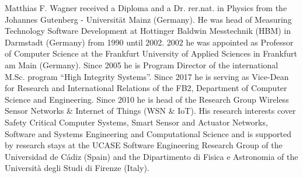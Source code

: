 \documentclass[10pt,journal,compsoc]{IEEEtran}
\begin{document}
\begin{IEEEbiography}{Matthias F. Wagner}
	 received a Diploma and a Dr. rer.nat. in Physics from the Johannes Gutenberg - Universität Mainz (Germany). He was head of Measuring Technology Software Development at Hottinger Baldwin Messtechnik (HBM) in Darmstadt (Germany) from 1990 until 2002. 2002 he was appointed as Professor of Computer Science at the Frankfurt University of Applied Sciences in Frankfurt am Main (Germany). Since 2005 he is Program Director of the international M.Sc. program ``High Integrity Systems''. Since 2017 he is serving as Vice-Dean for Research and International Relations of the FB2, Department of Computer Science and Engineering. Since 2010 he is head of the Research Group Wireless Sensor Networks \& Internet of Things (WSN \& IoT). His research interests cover Safety Critical Computer Systems, Smart Sensor and Actuator Networks, Software and Systems Engineering and Computational Science and is supported by research stays at the UCASE Software Engineering Research Group of the Universidad de C\'adiz (Spain) and the Dipartimento di Fisica e Astronomia of the Università degli Studi di Firenze (Italy). 
\end{IEEEbiography}
\end{document}
